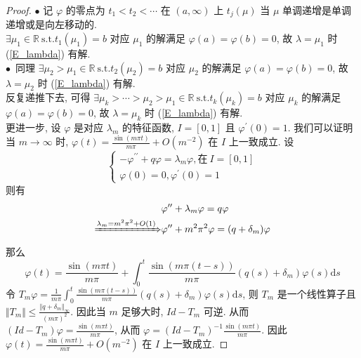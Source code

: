 \documentclass[11pt]{ctexart}[UTF8]
\begin{document}
\begin{proof}
$\bullet$ 记 $\varphi$ 的零点为 $t_1 < t_2 < \cdots$ 在 $(a,\infty)$ 上 $t_{j}(\mu)$ 当 $\mu$ 单调递增是单调递增或是向左移动的.\\
$\exists \mu_{1} \in \mathbb{R}\ \mathrm{s.t.} t_{1}(\mu_{1}) = b$ 对应 $\mu_{1}$ 的解满足 $\varphi(a)=\varphi(b)=0$, 故 $\lambda=\mu_{1}$ 时 (\ref{E_lambda}) 有解.\\
$\bullet$\ 同理 $\exists \mu_{2} > \mu_{1} \in \mathbb{R}\ \mathrm{s.t.} t_{2}(\mu_{2}) = b$ 对应 $\mu_{2}$ 的解满足 $\varphi(a)=\varphi(b)=0$, 
故 $\lambda=\mu_{2}$ 时 (\ref{E_lambda}) 有解.\\
反复递推下去, 可得 $\exists \mu_{k} > \cdots > \mu_{2} > \mu_{1} \in \mathbb{R}\ \mathrm{s.t.} t_{k}(\mu_{k}) = b$ 对应 $\mu_{k}$ 的解满足 $\varphi(a)=\varphi(b)=0$,
故 $\lambda=\mu_{k}$ 时 (\ref{E_lambda}) 有解.\\
更进一步, 设 $\varphi$ 是对应 $\lambda_{m}$ 的特征函数, $I=[0,1]$ 且 $\varphi^{\prime}(0)=1$. 我们可以证明当 $m \to \infty$ 时, $\varphi(t) = \frac{\sin(m\pi t)}{m\pi}+O(m^{-2})$
在 $I$ 上一致成立.
设
\begin{equation*}
    \begin{cases}
        -\varphi^{\prime\prime} + q \varphi = \lambda_{m} \varphi, \text{在}\  I=[0,1] \\
        \varphi(0) = 0, \varphi^{\prime}(0) = 1
    \end{cases}
\end{equation*}
则有
\begin{equation*}
    \begin{aligned}
        &\varphi^{\prime\prime} + \lambda_{m} \varphi  = q \varphi \\
        \xRightarrow{\lambda_{m} = m^2\pi^2+O(1)}&\varphi^{\prime\prime} + m^2 \pi^2 \varphi = (q + \delta_{m}) \varphi
    \end{aligned}
\end{equation*}
那么
\begin{equation*}
    \varphi(t) = \frac{\sin(m\pi t)}{m\pi} + \int_{0}^{t} \frac{\sin(m\pi (t-s))}{m\pi} (q(s) + \delta_{m}) \varphi(s)\mathrm{d}s
\end{equation*}
令 $T_{m}\varphi= \frac{1}{m\pi}\int_{0}^{t} \frac{\sin(m\pi (t-s))}{m\pi} (q(s) + \delta_{m}) \varphi(s)\mathrm{d}s$, 则 $T_{m}$ 是一个线性算子且 
$\Vert T_{m} \Vert \leq \frac{\Vert q + \delta_{m} \Vert_{\infty}}{(m\pi)^2}$. 因此当 $m$ 足够大时, $Id - T_{m}$ 可逆. 从而
$(Id - T_{m})\varphi = \frac{\sin(m\pi t)}{m\pi}$, 从而 $\varphi = (Id - T_{m})^{-1} \frac{\sin(m\pi t)}{m\pi}$. 因此 $\varphi(t) = \frac{\sin(m\pi t)}{m\pi}+O(m^{-2})$ 在 $I$ 上一致成立.

\end{proof}
\end{document}
